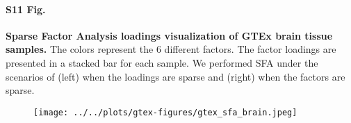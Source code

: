 \documentclass[10pt,letterpaper]{article}
\begin{document}
\paragraph*{S11 Fig.}

\label{figS11}
{\bf Sparse Factor Analysis loadings visualization of GTEx brain tissue samples.} The colors represent the 6 different factors. The factor loadings are presented in a stacked bar for each sample. We performed SFA under the scenarios of (left) when the loadings are sparse and (right) when the factors are sparse.

\begin{figure}[ht]
\centering
\texttt{[image: ../../plots/gtex-figures/gtex\_sfa\_brain.jpeg]}
\end{figure}
\end{document}
